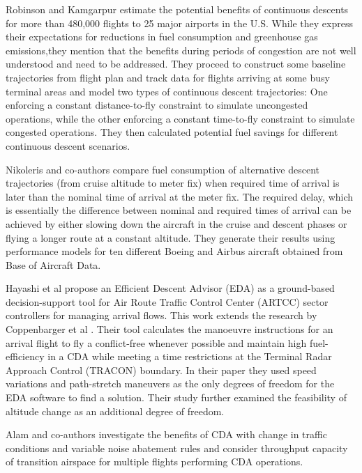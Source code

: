 \documentclass{aer1315-pretty}
\begin{document}
Robinson and Kamgarpur \cite{Rob:2010} estimate the potential benefits of continuous descents for more than 480,000 flights to 25 major airports in the U.S. While they express their expectations for reductions in fuel consumption and greenhouse gas emissions,they mention that the benefits during periods of congestion are not well understood and need to be addressed. They proceed to construct some baseline trajectories  from flight plan and track data for flights arriving at some busy terminal areas and model two types of continuous descent trajectories: One enforcing a constant distance-to-fly constraint to simulate uncongested operations, while the other enforcing a constant time-to-fly constraint to simulate congested operations. They then calculated potential fuel savings for different continuous descent scenarios. \par

Nikoleris and co-authors \cite{Niko:2012} compare fuel consumption of alternative descent trajectories (from cruise altitude to meter fix) when required time of arrival is later than the nominal time of arrival at the meter fix. The required delay, which is essentially the difference between nominal and required times of arrival can be achieved by either slowing down the aircraft in the cruise and descent phases or flying a longer route at a constant altitude. They generate their results using performance models for ten different Boeing and Airbus aircraft obtained from Base of Aircraft Data. \par

Hayashi et al \cite{Hayashi:2011} propose an Efficient Descent Advisor (EDA) as a ground-based decision-support tool for Air Route Traffic Control Center (ARTCC) sector controllers for managing arrival flows. This work extends the research by Coppenbarger et al \cite{Copp:2010b}. Their tool calculates the manoeuvre instructions for an arrival flight to fly a conflict-free whenever possible and maintain high fuel-efficiency in a CDA while meeting a time restrictions at the Terminal Radar Approach Control (TRACON) boundary. In their paper they used speed variations and path-stretch maneuvers as the only degrees of freedom for the EDA software to find a solution. Their study further examined the feasibility of altitude change as an additional degree of freedom. \par

Alam and co-authors \cite{Alam:2010} investigate the benefits of CDA with change in traffic conditions and variable noise abatement rules and consider throughput capacity of transition airspace for multiple flights performing CDA operations. \par
\end{document}

